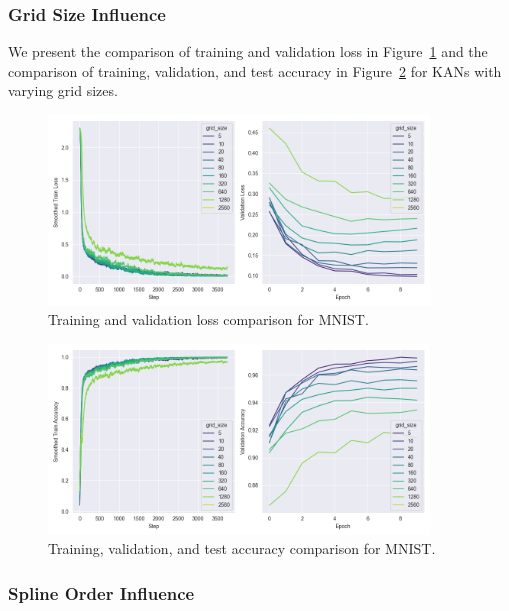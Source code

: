 \documentclass{article}
\begin{document}
\subsubsection{Grid Size Influence}\label{subsubsec:grid-size-influence}

We present the comparison of training and validation loss in Figure~\ref{fig:mnist_loss_grid_size}
and the comparison of training, validation, and test accuracy in Figure~\ref{fig:mnist_accuracy_grid_size} for KANs with varying grid sizes.


\begin{figure}[H]
    \centering
    \includegraphics[width=0.9\textwidth]{pics/mnist_loss_grid_size}
    \caption{Training and validation loss comparison for MNIST.}
    \label{fig:mnist_loss_grid_size}
\end{figure}

\begin{figure}[H]
    \centering
    \includegraphics[width=0.9\textwidth]{pics/mnist_accuracy_grid_size}
    \caption{Training, validation, and test accuracy comparison for MNIST.}
    \label{fig:mnist_accuracy_grid_size}
\end{figure}


\subsubsection{Spline Order Influence}\label{subsubsec:spline-order-influence}
\end{document}
